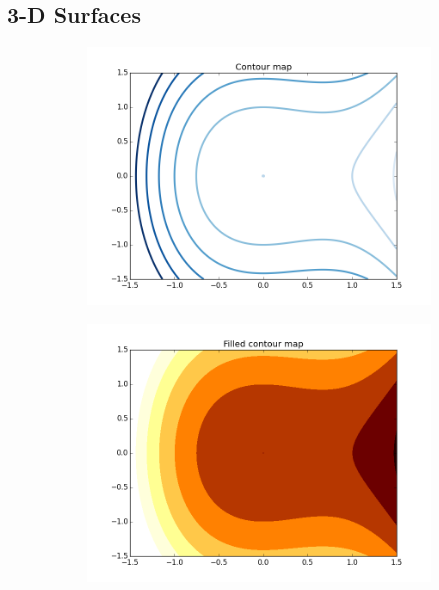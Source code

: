 
\subsection*{3-D Surfaces} %

\begin{figure}[h]
\centering
\begin{subfigure}{.45\textwidth}
\centering
\includegraphics[width=\textwidth]{contour_map.png}
\end{subfigure}
\begin{subfigure}{.45\textwidth}
\centering
\includegraphics[width=\textwidth]{contour_map_filled.png}

\end{subfigure}
\end{figure}
